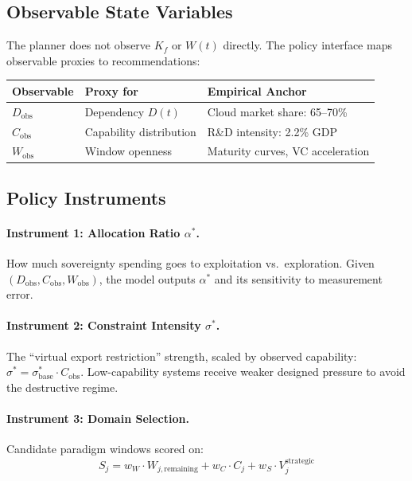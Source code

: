 \documentclass[11pt,a4paper]{article}
\theoremstyle{remark}
\begin{document}
\subsection{Observable State Variables}

The planner does not observe $K_f$ or $W(t)$ directly. The policy interface maps observable proxies to recommendations:

\begin{center}
\begin{tabular}{lll}
\toprule
\textbf{Observable} & \textbf{Proxy for} & \textbf{Empirical Anchor} \\
\midrule
$D_{\text{obs}}$ & Dependency $D(t)$ & Cloud market share: 65--70\% \\
$C_{\text{obs}}$ & Capability distribution & R\&D intensity: 2.2\% GDP \\
$W_{\text{obs}}$ & Window openness & Maturity curves, VC acceleration \\
\bottomrule
\end{tabular}
\end{center}

\subsection{Policy Instruments}

\paragraph{Instrument 1: Allocation Ratio $\alpha^*$.} How much sovereignty spending goes to exploitation vs.\ exploration. Given $(D_{\text{obs}}, C_{\text{obs}}, W_{\text{obs}})$, the model outputs $\alpha^*$ and its sensitivity to measurement error.

\paragraph{Instrument 2: Constraint Intensity $\sigma^*$.} The ``virtual export restriction'' strength, scaled by observed capability: $\sigma^* = \sigma^*_{\text{base}} \cdot C_{\text{obs}}$. Low-capability systems receive weaker designed pressure to avoid the destructive regime.

\paragraph{Instrument 3: Domain Selection.} Candidate paradigm windows scored on:
\begin{equation}
S_j = w_W \cdot W_{j,\text{remaining}} + w_C \cdot C_j + w_S \cdot V_j^{\text{strategic}}
\end{equation}
\end{document}
